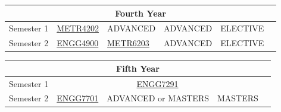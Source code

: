 \documentclass[a4paper,12pt]{report}
\begin{document}
\begin{table}[H]
    \centering
    \begin{tabular}{| m{6em} | m{5em} m{5em} m{5em} m{5em} m{5em} |}
        \hline
        \multicolumn{6}{|c|}{\bfseries Fourth Year} \\
        \hline
        Semester 1 & \hyperlink{METR4202}{METR4202} & ADVANCED & ADVANCED & ELECTIVE & \\
        Semester 2 & \hyperlink{ENGG4900}{ENGG4900} & \hyperlink{METR6203}{METR6203} & ADVANCED & ELECTIVE & \\
        \hline
    \end{tabular}
\end{table}
\begin{table}[H]
    \centering
    \begin{tabular}{| m{6em} | m{5em} m{5em} m{5em} m{5em} m{5em} |}
        \hline
        \multicolumn{6}{|c|}{\bfseries Fifth Year} \\
        \hline
        Semester 1 & \multicolumn{4}{c}{\hyperlink{ENGG7291}{ENGG7291}} & \\
        Semester 2 & \hyperlink{ENGG7701}{ENGG7701} & \multicolumn{2}{c}{ADVANCED or MASTERS} & MASTERS & \\
        \hline
    \end{tabular}
\end{table}
\renewcommand{\arraystretch}{1}
\newpage
\end{document}
